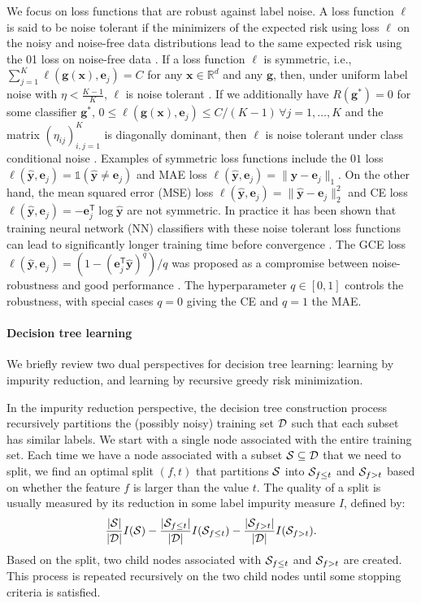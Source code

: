 \documentclass[letterpaper]{article} %
\newcommand{\R}{{\mathbb{R}}}
\newcommand{\bx}{{\bm{x}}}
\newcommand{\bg}{{\bm{g}}}
\newcommand{\by}{{\bm{y}}}
\newcommand{\be}{{\bm{e}}}
\newcommand{\T}{{\mathsf{T}}}
\newcommand{\I}{\mathds{1}}
\newcommand{\cS}{{\cal{S}}}
\newcommand{\cD}{{\cal{D}}}
\begin{document}
We focus on loss functions that are robust against label noise.
A loss function $\ell$ is said to be noise tolerant if the minimizers of the
expected risk using loss $\ell$ on the noisy and noise-free data distributions
lead to the same expected risk using the 01 loss on noise-free data
\cite{manwani2013noise}.
If a loss function $\ell$ is symmetric, i.e., 
$\sum_{j=1}^K \ell(\bg(\bx),\be_j)=C$ for any $\bx\in\R^d$ and any $\bg$,
then, under uniform label noise with $\eta<\frac{K-1}{K}$, $\ell$ is noise tolerant \cite{ghosh2015making,ghosh2017robust}. 
If we additionally have 
$R(\bg^*)=0$ for some classifier $\bg^{*}$, 
$0\leq \ell(\bg(\bx),\be_j)\leq C/(K-1)\,\forall j=1,\ldots,K$ 
and the matrix 
$(\eta_{ij})_{i,j=1}^K$ 
is diagonally dominant, then $\ell$ is noise tolerant under class conditional noise \cite{ghosh2017robust}.
Examples of symmetric loss functions include the $01$ loss $\ell(\widehat{\by},\be_j)=\I(\widehat{\by}\ne \be_j)$ 
and MAE loss $\ell(\widehat{\by},\be_j) = \|\widehat{\by}-\be_j\|_1$. 
On the other hand, the mean squared error (MSE) loss
$\ell(\widehat{\by},\be_j)=\|\widehat{\by}-\be_j\|_2^2$ and CE
loss $\ell(\widehat{\by},\be_j) = -\be_j^\T\log \widehat{\by}$ are not
symmetric.
In practice it has been shown that training neural network (NN) classifiers with these noise tolerant loss functions can lead to significantly longer training time before convergence \cite{zhang2018generalized}. 
The GCE loss $\ell(\widehat{\by},\be_j)=(1-(\be_j^\T
\widehat{\by})^q)/q$ was proposed as a compromise between noise-robustness and
good performance \cite{zhang2018generalized}. The hyperparameter $q\in[0,1]$
controls the robustness, with special cases $q=0$ giving the CE and $q=1$ the
MAE. 

\paragraph{Decision tree learning} 
We briefly review two dual perspectives for decision tree learning:
learning by impurity reduction, and learning by recursive greedy risk minimization.

In the impurity reduction perspective, the decision tree construction process
recursively partitions the (possibly noisy) training set $\cD$ such that each
subset has similar labels.
We start with a single node associated with the entire training set.
Each time we have a node associated with a subset $\cS \subseteq \cD$ that we
need to split, we find an optimal split $(f,t)$ that partitions $\cS$ into 
$\cS_{f \leq t}$ and $\cS_{f > t}$ based on whether the feature $f$ is larger
than the value $t$.
The quality of a split is usually measured by its reduction in some label
impurity measure $I$, defined by:
\[
    \frac{|\cS|}{|\cD|}I(\cS) - \frac{|\cS_{f\leq t}|}{|\cD|}I(\cS_{f\leq t}) - \frac{|\cS_{f> t}|}{|\cD|}I(\cS_{f> t}).
\]
Based on the split, two child nodes associated with $\cS_{f \leq t}$ and 
$\cS_{f > t}$ are created. 
This process is repeated recursively on the two child nodes until some stopping
criteria is satisfied. 
\end{document}

